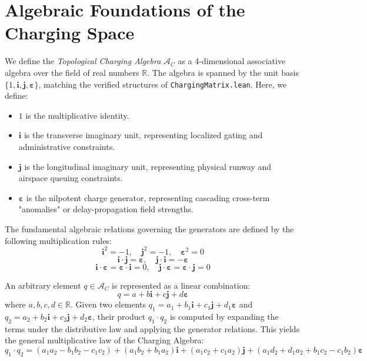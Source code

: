 \documentclass[11pt,a4paper]{book}
\begin{document}
\section{Algebraic Foundations of the Charging Space}
\label{sec:charging_algebra}

We define the \textit{Topological Charging Algebra} $\mathcal{A}_C$ as a 4-dimensional associative algebra over the field of real numbers $\mathbb{R}$. The algebra is spanned by the unit basis $\{1, \mathbf{i}, \mathbf{j}, \boldsymbol{\varepsilon}\}$, matching the verified structures of \texttt{ChargingMatrix.lean}. Here, we define:
\begin{itemize}
    \item $1$ is the multiplicative identity.
    \item $\mathbf{i}$ is the transverse imaginary unit, representing localized gating and administrative constraints.
    \item $\mathbf{j}$ is the longitudinal imaginary unit, representing physical runway and airspace queuing constraints.
    \item $\boldsymbol{\varepsilon}$ is the nilpotent charge generator, representing cascading cross-term "anomalies" or delay-propagation field strengths.
\end{itemize}

The fundamental algebraic relations governing the generators are defined by the following multiplication rules:
\begin{equation}
\mathbf{i}^2 = -1, \quad \mathbf{j}^2 = -1, \quad \boldsymbol{\varepsilon}^2 = 0
\end{equation}
\begin{equation}
\mathbf{i} \cdot \mathbf{j} = \boldsymbol{\varepsilon}, \quad \mathbf{j} \cdot \mathbf{i} = -\boldsymbol{\varepsilon}
\end{equation}
\begin{equation}
\mathbf{i} \cdot \boldsymbol{\varepsilon} = \boldsymbol{\varepsilon} \cdot \mathbf{i} = 0, \quad \mathbf{j} \cdot \boldsymbol{\varepsilon} = \boldsymbol{\varepsilon} \cdot \mathbf{j} = 0
\end{equation}

An arbitrary element $q \in \mathcal{A}_C$ is represented as a linear combination:
\begin{equation}
q = a + b\mathbf{i} + c\mathbf{j} + d\boldsymbol{\varepsilon}
\end{equation}
where $a, b, c, d \in \mathbb{R}$. Given two elements $q_1 = a_1 + b_1\mathbf{i} + c_1\mathbf{j} + d_1\boldsymbol{\varepsilon}$ and $q_2 = a_2 + b_2\mathbf{i} + c_2\mathbf{j} + d_2\boldsymbol{\varepsilon}$, their product $q_1 \cdot q_2$ is computed by expanding the terms under the distributive law and applying the generator relations. This yields the general multiplicative law of the Charging Algebra:
\begin{equation}
\label{eq:charging_mul_final_nonrep_with_eps}
q_1 \cdot q_2 = (a_1 a_2 - b_1 b_2 - c_1 c_2) + (a_1 b_2 + b_1 a_2)\mathbf{i} + (a_1 c_2 + c_1 a_2)\mathbf{j} + (a_1 d_2 + d_1 a_2 + b_1 c_2 - c_1 b_2)\boldsymbol{\varepsilon}
\end{equation}
\end{document}
